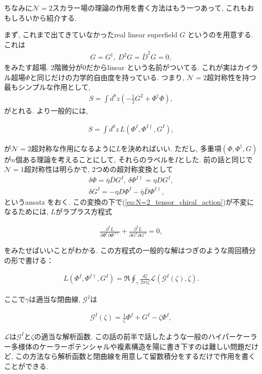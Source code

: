 \documentclass{ltjsarticle}
\theoremstyle{definition}
\newcommand{\parno}{\par\noindent}
\begin{document}
ちなみに$\mathcal N=2$スカラー場の理論の作用を書く方法はもう一つあって, これもおもしろいから紹介する.\par
まず, これまで出てきていなかったreal linear superfield $G$ というのを用意する. これは
\begin{align}
  G=G^\dagger,\ D^2G=\bar D^2G=0,
\end{align}
をみたす超場. 2階微分が0だからlinear という名前がついてる. これが実はカイラル超場$\Phi$と同じだけの力学的自由度を持っている. つまり, $\mathcal N=2$超対称性を持つ最もシンプルな作用として,
\begin{align}
  S=\int d^8z\left(-\frac12G^2+\Phi^\dagger\Phi\right),
\end{align}
がとれる. より一般的には,
\begin{tcolorbox}
\begin{align}
  S=\int d^8z\,L(\Phi^I,\Phi^{I\dagger},G^I),\label{eq:N=2_tensor_chiral_action}
\end{align}
\end{tcolorbox}
\parno
が$\mathcal N=2$超対称な作用になるように$L$を決めればいい. ただし, 多重項$(\Phi,\Phi^\dagger,G)$が$n$個ある理論を考えることにして, それらのラベルを$I$とした. 前の話と同じで$\mathcal N=1$超対称性は明らかで, 2つめの超対称変換として
\begin{gather}
\delta \Phi=\bar\eta\bar DG^I,\ \delta\Phi^{I\dagger}=\eta DG^I,\\
\delta G^I=-\eta D\Phi^I-\bar\eta\bar D\Phi^{I\dagger},
\end{gather}
というansatz をおく. この変換の下で(\ref{eq:N=2_tensor_chiral_action})が不変になるためには, $L$がラプラス方程式
\begin{tcolorbox}
\begin{align}
  \frac{\partial^2L}{\partial\Phi^I\partial\Phi^{J\dagger}}+\frac{\partial^2L}{\partial G^I\partial G^J}=0,
\end{align}
\end{tcolorbox}
\parno
をみたせばいいことがわかる. この方程式の一般的な解はつぎのような周回積分の形で書ける：
\begin{tcolorbox}
\begin{align}
L(\Phi^I,\Phi^{I\dagger},G^I)=\Re\oint_\gamma\frac{d\zeta}{2\pi i\zeta}\mathcal L\left(\mathcal G^I(\zeta),\zeta\right).
\end{align}
\end{tcolorbox}
\parno
ここで$\gamma$は適当な閉曲線, $\mathcal G^I$は
\begin{tcolorbox}
\begin{align}
  \mathcal G^I(\zeta)=\frac1\zeta\Phi^I+G^I-\zeta\Phi^I,
\end{align}
\end{tcolorbox}
\parno
$\mathcal L$は$\mathcal G^I$と$\zeta$の適当な解析函数. この話の前半で話したような一般のハイパーケーラー多様体のケーラーポテンシャルや複素構造を陽に書き下すのは難しい問題だけど, この方法なら解析函数と閉曲線を用意して留数積分をするだけで作用を書くことができる.
\end{document}

